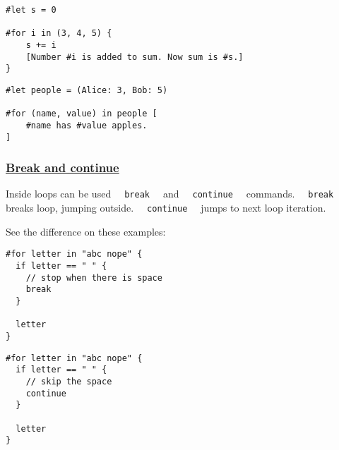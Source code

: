 \begin{verbatim}
#let s = 0

#for i in (3, 4, 5) {
    s += i
    [Number #i is added to sum. Now sum is #s.]
}
\end{verbatim}

\pandocbounded{}

\begin{verbatim}
#let people = (Alice: 3, Bob: 5)

#for (name, value) in people [
    #name has #value apples.
]
\end{verbatim}

\pandocbounded{}

\subsubsection{\texorpdfstring{\hyperref[break-and-continue]{Break and
continue}}{Break and continue}}\label{break-and-continue}

Inside loops can be used \texttt{\ }{\texttt{\ break\ }}\texttt{\ } and
\texttt{\ }{\texttt{\ continue\ }}\texttt{\ } commands.
\texttt{\ }{\texttt{\ break\ }}\texttt{\ } breaks loop, jumping outside.
\texttt{\ }{\texttt{\ continue\ }}\texttt{\ } jumps to next loop
iteration.

See the difference on these examples:

\begin{verbatim}
#for letter in "abc nope" {
  if letter == " " {
    // stop when there is space
    break
  }

  letter
}
\end{verbatim}

\pandocbounded{}

\begin{verbatim}
#for letter in "abc nope" {
  if letter == " " {
    // skip the space
    continue
  }

  letter
}
\end{verbatim}

\pandocbounded{}

